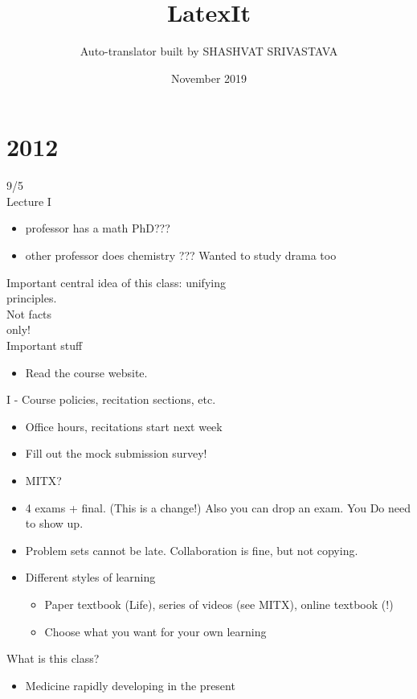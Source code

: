 \documentclass{article}
\title{LatexIt}
\author{Auto-translator built by SHASHVAT SRIVASTAVA}
\date{November 2019}
\begin{document}
\maketitle
\tableofcontents
\newpage

\section{2012}9/5\\
Lecture I
\begin{itemize}
\item  professor has a math PhD???
\item  other professor does chemistry ??? Wanted to study drama too
\end{itemize}
Important central idea of this class: unifying\\
principles.\\
Not facts\\
only!\\
Important stuff
\begin{itemize}
\item  Read the course website.
\end{itemize}
I - Course policies, recitation sections, etc.
\begin{itemize}
\item  Office hours, recitations start next week
\item  Fill out the mock submission survey!
\end{itemize}
\begin{itemize}
\item  MITX?
\end{itemize}
\begin{itemize}
\item 4 exams + final. (This is a change!) Also you can drop an exam.
You Do need to show up.
\end{itemize}
\begin{itemize}
\item  Problem sets cannot be late. Collaboration is fine, but not copying.
\item  Different styles of learning
\begin{itemize}
\item  Paper textbook (Life), series of videos (see MITX), online textbook (!)
\item  Choose what you want for your own learning
\end{itemize}
\end{itemize}
What is this class?
\begin{itemize}
\item  Medicine rapidly developing in the present
\end{itemize}
\end{document}
